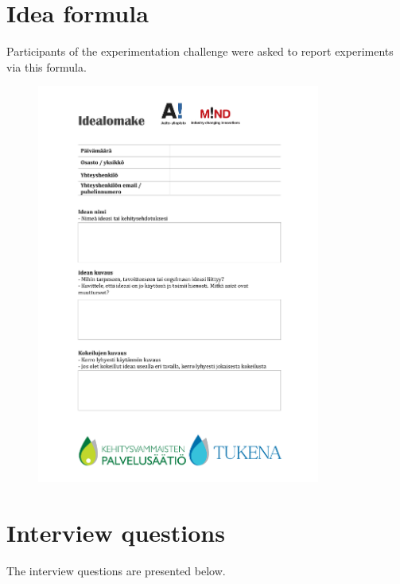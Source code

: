 \clearpage
\section{Idea formula}
\label{ideaformula}
Participants of the experimentation challenge were asked to report experiments via this formula.  
\bigskip

\begin{figure}[ht]
           \includegraphics[width=0.83\textwidth]{idealomake.pdf}
\end{figure}

\clearpage

\section{Interview questions}
\label{haastisrunko}
The interview questions are presented below.
\bigskip

